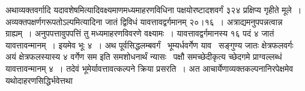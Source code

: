 \documentclass[11pt, openany]{book}
\begin{document}
\begin{sloppypar}
अथाव्यक्तवर्गादि यदावशेषमित्यादिवक्ष्यमाणमध्यमाहरणविधिना पक्षयोरष्टादशवर्गं ३२४ प्रक्षिप्य गृहीते मूले~। \, अव्यक्तपक्षर्णगरूपतोऽल्पमित्यादिना जातं द्विविधं यावत्तावद्वर्गमानम् २०।१६~। अत्राद्यमनुपपन्नत्वान्न ग्राह्यम्~। अनुपपत्तावुपपत्तिं तु मध्यमाहरणविवरणे वक्ष्यामः~। यावत्तावद्वर्गमानस्य १६ पदं ४ जातं यावत्तावन्मानम्~। इयमेव भूः ४~। अथ पूर्वसिद्धलम्बवर्गं \, भूम्यर्धवर्गेण याव \, सङ्गुण्य जातः क्षेत्रफलवर्गः \, अयं क्षेत्रफलस्यास्य ४ वर्गेण सम इति समशोधनार्थं न्यासः \, पक्षौ समच्छेदीकृत्य च्छेदगमे प्राग्वल्लब्धं यावत्तावन्मानम् ४~। तदेवं भूमेर्यावत्तावत्कल्पने क्रिया प्रसरति~। अत आचार्येणाव्यक्तकल्पनानिरपेक्षमेव यथोदाहरणसिद्धिर्भवेत्तथा
\end{sloppypar}

\newpage
\end{document}
